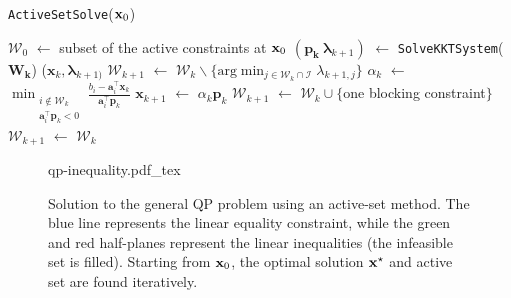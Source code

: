 \begin{algorithm}
\caption{\texttt{ActiveSetSolve}($\mathbf{x}_0$)}
\label{alg:chap3-active-set}
\begin{algorithmic}
\STATE $\mathcal{W}_0$ $\leftarrow$ subset of the active constraints at $\mathbf{x}_0$
\STATE $(\mathbf{p_k}~\boldsymbol{\lambda}_{k+1})$ $\leftarrow$ \texttt{SolveKKTSystem}($\mathbf{W_k}$)
\RETURN ($\mathbf{x}_k,\boldsymbol{\lambda}_{k+1)}$
\ELSE
{}
\STATE $\mathcal{W}_{k+1}$ $\leftarrow$ $\mathcal{W}_k \backslash \{\text{arg}\min_{j\in\mathcal{W}_k\cap\mathcal{I}}\lambda_{k+1,j}\}$
\ENDIF
\ELSE
{}
\STATE $\alpha_k$ $\leftarrow$ $\min_{\substack{i\notin\mathcal{W}_k\\\mathbf{a}_i^{\top}\mathbf{p}_k<0}} \frac{b_i-\mathbf{a}_i^{\top}\mathbf{x}_k}{\mathbf{a}_i^{\top}\mathbf{p}_k}$
\STATE $\mathbf{x}_{k+1}$ $\leftarrow$ $\alpha_k\mathbf{p}_k$
\STATE $\mathcal{W}_{k+1}$ $\leftarrow$ $\mathcal{W}_k\cup\{$one blocking constraint$\}$
\ELSE
{}
\STATE $\mathcal{W}_{k+1}$ $\leftarrow$ $\mathcal{W}_k$
\ENDIF
\ENDIF
\ENDFOR
\end{algorithmic}
\end{algorithm}

\begin{figure}
  \centering
      {\def\svgwidth{0.8\linewidth}
        {\footnotesize
          
                     {qp-inequality.pdf_tex}
        }
      }
      \caption[Solution to the general QP problem using an active-set
        method.]{Solution to the general QP problem using an
        active-set method. The blue line represents the linear
        equality constraint, while the green and red half-planes
        represent the linear inequalities (the infeasible set is
        filled). Starting from $\mathbf{x}_0$, the optimal solution
        $\mathbf{x}^{\star}$ and active set are found iteratively.}
      \label{fig:chap3-qp-inequality}
\end{figure}

